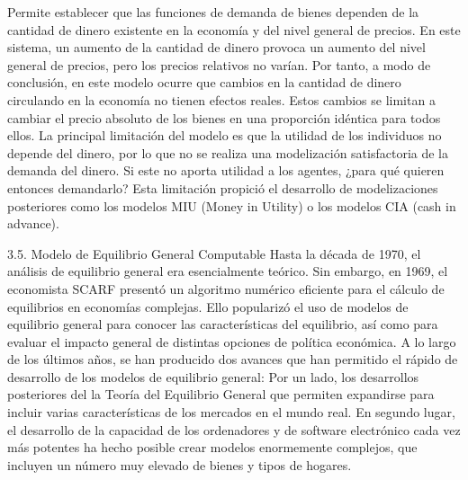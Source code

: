 \documentclass[10pt,a4paper]{article}
\begin{document}
	Permite establecer que las funciones de demanda de bienes dependen de la cantidad de dinero existente en la economía y del nivel general de precios. 
En este sistema, un aumento de la cantidad de dinero provoca un aumento del nivel general de precios, pero los precios relativos no varían. 
Por tanto, a modo de conclusión, en este modelo ocurre que cambios en la cantidad de dinero circulando en la economía no tienen efectos reales. Estos cambios se limitan a cambiar el precio absoluto de los bienes en una proporción idéntica para todos ellos. 
La principal limitación del modelo es que la utilidad de los individuos no depende del dinero, por lo que no se realiza una modelización satisfactoria de la demanda del dinero. Si este no aporta utilidad a los agentes, ¿para qué quieren entonces demandarlo? 
Esta limitación propició el desarrollo de modelizaciones posteriores como los modelos MIU (Money in Utility) o los modelos CIA (cash in advance). 



3.5. Modelo de Equilibrio General Computable
Hasta la década de 1970, el análisis de equilibrio general era esencialmente teórico. Sin embargo, en 1969, el economista SCARF presentó un algoritmo numérico eficiente para el cálculo de equilibrios en economías complejas. Ello popularizó el uso de modelos de equilibrio general para conocer las características del equilibrio, así como para evaluar el impacto general de distintas opciones de política económica. A lo largo de los últimos años, se han producido dos avances que han permitido el rápido de desarrollo de los modelos de equilibrio general:
	Por un lado, los desarrollos posteriores del la Teoría del Equilibrio General que permiten expandirse para incluir varias características de los mercados en el mundo real. 
	En segundo lugar, el desarrollo de la capacidad de los ordenadores y de software electrónico cada vez más potentes ha hecho posible crear modelos enormemente complejos, que incluyen un número muy elevado de bienes y tipos de hogares.  
\end{document}
